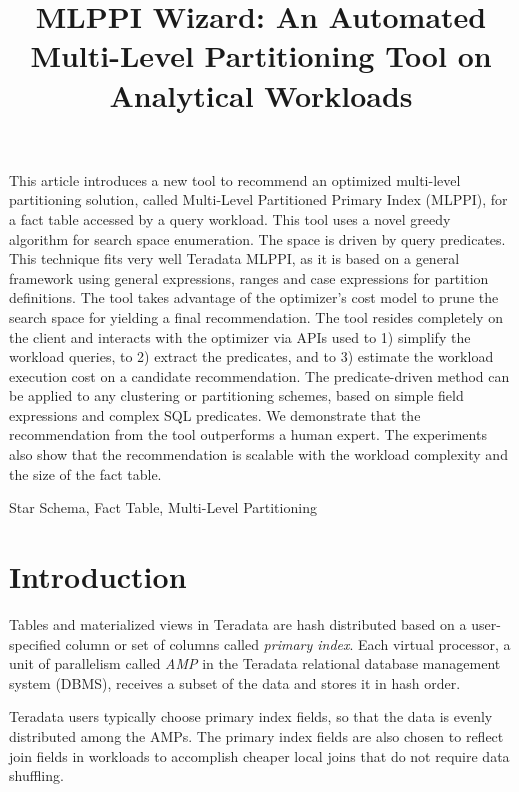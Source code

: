 \documentclass[paper]{ieice}
\title{MLPPI Wizard: An Automated Multi-Level Partitioning Tool on Analytical Workloads}
\begin{document}
\maketitle

\begin{summary}
This article introduces a new tool to \hbox{recommend} 
an optimized multi-level partitioning solution, called 
\hbox{Multi-Level} Partitioned Primary Index (MLPPI), for a fact table accessed by a query workload. 
This tool uses a novel greedy algorithm for search space enumeration. The space is driven by query \hbox{predicates}. 
This \hbox{technique} fits very well Teradata MLPPI, 
as it is based on a \hbox{general} \hbox{framework} \hbox{using} general
expressions, ranges and case expressions for partition 
definitions. 
The tool takes \hbox{advantage} of the optimizer’s cost model to prune the search space for yielding a final recommendation. 
The tool resides completely on the client and interacts with the optimizer via APIs 
used to 1) simplify the workload queries, 
to 2) extract the predicates, and 
to 3) estimate the workload execution cost on a candidate recommendation. 
The predicate-driven method can be applied to any clustering or partitioning schemes, 
based on simple field expressions and complex SQL predicates. 
We demonstrate that the recommendation from the tool outperforms a human expert. The experiments also show that the recommendation is scalable with the workload complexity and the size of the fact table.

\end{summary}
\begin{keywords}
Star Schema, Fact Table, Multi-Level Partitioning
\end{keywords}

\section{Introduction}
\label{sec:intro}

Tables and materialized views in Teradata are hash distributed based 
on a user-specified column or set of columns called {\em primary index}. 
Each virtual processor, a unit of parallelism called {\em AMP} in the \hbox{Teradata} \hbox{relational} 
database management system (DBMS), 
receives a subset of the data and stores it in hash order. 

Teradata users typically choose primary index fields, 
so that the data is evenly distributed among the AMPs. 
The primary index fields are also chosen to \hbox{reflect} join fields 
in workloads to accomplish cheaper local joins that do not require 
data shuffling. 
\end{document}
